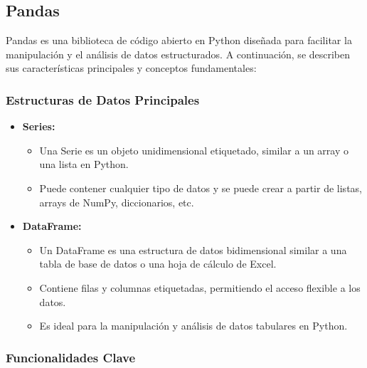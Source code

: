 \documentclass[conference]{IEEEtran}
\begin{document}
    \subsection{Pandas}
    Pandas es una biblioteca de código abierto en Python diseñada para facilitar la manipulación y el análisis de datos estructurados. A continuación, se describen sus características principales y conceptos fundamentales:
    
    \subsubsection*{Estructuras de Datos Principales}
    
    \begin{itemize}
      \item \textbf{Series:}
        \begin{itemize}
          \item Una Serie es un objeto unidimensional etiquetado, similar a un array o una lista en Python.
          \item Puede contener cualquier tipo de datos y se puede crear a partir de listas, arrays de NumPy, diccionarios, etc.
        \end{itemize}
      
      \item \textbf{DataFrame:}
        \begin{itemize}
          \item Un DataFrame es una estructura de datos bidimensional similar a una tabla de base de datos o una hoja de cálculo de Excel.
          \item Contiene filas y columnas etiquetadas, permitiendo el acceso flexible a los datos.
          \item Es ideal para la manipulación y análisis de datos tabulares en Python.
        \end{itemize}
    \end{itemize}
    
    \subsubsection*{Funcionalidades Clave}
    
\end{document}
